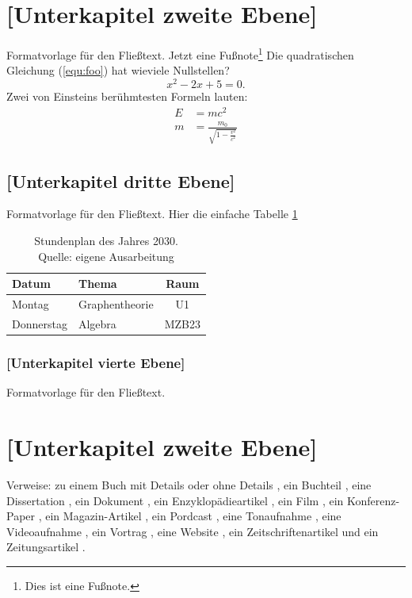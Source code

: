 \documentclass[a4paper,12pt,twoside]{scrreprt}
\begin{document}
\section{[Unterkapitel zweite Ebene]}
Formatvorlage für den Fließtext.
Jetzt eine Fußnote\footnote{Dies ist eine Fußnote.}
Die quadratischen Gleichung (\ref{equ:foo}) hat wieviele Nullstellen?
\begin{equation}
 \label{equ:foo}
 x^2-2x+5=0.
\end{equation}
Zwei von Einsteins berühmtesten Formeln lauten:
\begin{eqnarray*}
  E &= mc^2                                  \\
  m &= \frac{m_0}{\sqrt{1-\frac{v^2}{c^2}}}
\end{eqnarray*}


\subsection{[Unterkapitel dritte Ebene]}
Formatvorlage für den Fließtext. Hier die einfache Tabelle \ref{tab:sp}

\begin{table}[htb]
  \centering
  \begin{tabular}{ | l | l |c|}
    \hline
    Datum      & Thema           & Raum \\
    \hline\hline
    Montag     & Graphentheorie  & U1   \\
    \hline
    Donnerstag & Algebra         & MZB23\\
    \hline
  \end{tabular}
  \caption[Stundenplan]{Stundenplan des Jahres 2030.\\Quelle: eigene Ausarbeitung}
  \label{tab:sp}
\end{table}

\subsubsection{[Unterkapitel vierte Ebene]}
Formatvorlage für den Fließtext.



\section{[Unterkapitel zweite Ebene]}

Verweise: zu einem Buch mit Details \cite[vgl.][Kapitel 2]{bathe_finite-elemente-methoden_1990} oder ohne Details \cite{bathe_finite-elemente-methoden_1990}, ein Buchteil \cite{areger_problem-based_2007}, eine Dissertation \cite{sporn_interaktives_2000}, ein Dokument \cite{industriellenvereinigung_beste_2014}, ein Enzyklopädieartikel \cite{brockhaus_kreativitat_1872}, ein Film \cite{de_wilde_through_2008}, ein Konferenz-Paper \cite{weber_podcasts._2006}, ein Magazin-Artikel \cite{autornachname1_magazinartikeltitel_1995}, ein Pordcast \cite{paulus_horen_????}, eine Tonaufnahme \cite{horowitz_horowitz_2003}, eine Videoaufnahme \cite{fhvlearningsupport_was_2008}, ein Vortrag \cite{kohls_literaturverwaltung_2008}, eine Website \cite{wedekind_von_2008}, ein Zeitschriftenartikel \cite{hofer_wir_2008} und ein Zeitungsartikel \cite{schenkel_tsunami_2012}.
\end{document}
